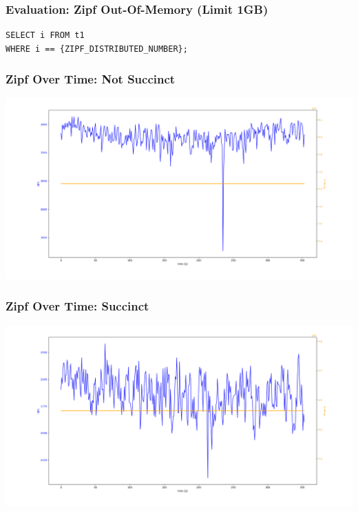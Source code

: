 \documentclass[aspectratio=43]{beamer}
\begin{document}
\begin{frame}[fragile]
    \frametitle{Evaluation: Zipf Out-Of-Memory (Limit 1GB)}
\begin{lstlisting}[style=SQL]
SELECT i FROM t1 
WHERE i == {ZIPF_DISTRIBUTED_NUMBER};
\end{lstlisting}

\scalebox{0.9}{

}
\end{frame}

\begin{frame}
    \frametitle{Zipf Over Time: Not Succinct}
 
    \includegraphics[width=\framewidth]{figures/plots/not_succinct_large.png}   
\end{frame}

\begin{frame}
    \frametitle{Zipf Over Time: Succinct}
 
    \includegraphics[width=\framewidth]{figures/plots/succinct_not_adaptive_large.png}   
\end{frame}
\end{document}
